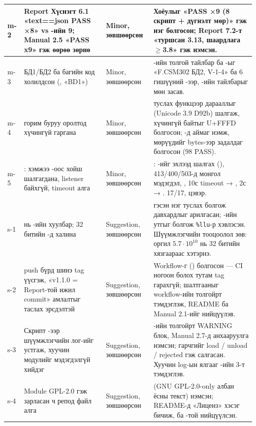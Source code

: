 {\begin{longtable}{|L{0.05\textwidth}|L{0.27\textwidth}|L{0.13\textwidth}|L{0.45\textwidth}|}
m-2 & Report Хүснэгт 6.1 «text==json PASS ×8» vs -ийн 9; Manual 2.5 «PASS x9» гэж өөрөө зөрнө & Minor, зөвшөөрсөн & Хоёулыг «PASS ×9 (8 скрипт + дүгнэлт мөр)» гэж нэг болгосон; Report 7.2-т «туршсан 3.13, шаардлага $\ge$3.8» гэж нэмсэн. \\ \hline
m-3 & БД1/БД2 ба багийн код холилдсон (,  «BD1») & Minor, зөвшөөрсөн & -ийн толгой тайлбар ба -ыг «F.CSM302 БД2, V-1-4» ба 6 гишүүний -ээр, -ийн тайлбарыг мөн засав. \\ \hline
m-4 &  горим буруу  оролтод хүчингүй  гаргана & Minor, зөвшөөрсөн &  туслах функцээр  дарааллыг (Unicode 3.9 D92b) шалгаж, хүчингүй байтыг U+FFFD болгосон; -д  аймаг нэмж,  мөрүүдийг bytes-ээр задалдаг болгосон (98 PASS). \\ \hline
m-5 & : хэмжээ -оос хойш шалгагдана,   listener байхгүй, timeout алга & Minor, зөвшөөрсөн & : -ийг эхлээд шалгах (), 413/400/503-д монгол мэдэгдэл, , 10с timeout → , 2с → .  17/17,  цэвэр. \\ \hline
s-1 &  нь -ийн хуулбар;   32 битийн -д халина & Suggestion, зөвшөөрсөн &  гэсэн нэг туслах болгож давхардлыг арилгасан; -ийн утгыг  болгож \texttt{\%llu}-р хэвлэсэн. Шүүмжлэгчийн тооцоолол зөв: оргил $5.7\cdot10^{10}$ нь 32 битийн хязгаараас хэтэрнэ. \\ \hline
s-2 &  push бүрд шинэ tag үүсгэж, «v1.1.0 = Report-той ижил commit» амлалтыг таслах эрсдэлтэй & Suggestion, зөвшөөрсөн & Workflow-г  () болгосон --- CI ногоон болох тутам tag гарахгүй; шалтгааныг workflow-ийн толгойрт тэмдэглэж, README ба Manual 2.1-ийг нийцүүлэв. \\ \hline
s-3 & Скрипт -ээр шүүмжлэгчийн лог-ийг устгаж, хуучин модулийг мэдэгдэлгүй  хийдэг & Suggestion, зөвшөөрсөн & -ийн толгойрт WARNING блок, Manual 2.7-д анхааруулга нэмсэн;  гарчгийг load / unload / rejected гэж салгасан. Хуучин log-ын ялгааг -ийн 3-т тэмдэглэв. \\ \hline
s-4 & Module GPL-2.0 гэж зарласан ч репод  файл алга & Suggestion, зөвшөөрсөн &  (GNU GPL-2.0-only албан ёсны текст) нэмсэн; README-д «Лиценз» хэсэг бичиж,  ба -той нийцүүлсэн. \\ \hline
\end{longtable}
\par}

